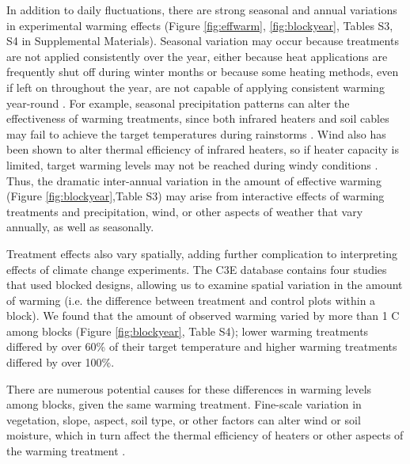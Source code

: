 \documentclass{article}
\begin{document}
\par In addition to daily fluctuations, there are strong seasonal and annual variations in experimental warming effects (Figure \ref{fig:effwarm}, \ref{fig:blockyear}, Tables S3, S4 in Supplemental Materials). Seasonal variation may occur because treatments are not applied consistently over the year, either because heat applications are frequently shut off during winter months or because some heating methods, even if left on throughout the year, are not capable of applying consistent warming year-round \citep[e.g.][]{clark2014a,clark2014b,hagedorn2010}. For example, seasonal precipitation patterns can alter the effectiveness of warming treatments, since both infrared heaters and soil cables may fail to achieve the target temperatures during rainstorms \citep{peterjohn1993,hoeppner2012}. Wind also has been shown to alter thermal efficiency of infrared heaters, so if heater capacity is limited, target warming levels may not be reached during windy conditions \citep{kimball2005,kimball2008}. Thus, the dramatic inter-annual variation in the amount of effective warming (Figure \ref{fig:blockyear},Table S3) may arise from interactive effects of warming treatments and precipitation, wind, or other aspects of weather that vary annually, as well as seasonally. 

\par Treatment effects also vary spatially, adding further complication to interpreting effects of climate change experiments. The C3E database contains four studies that used blocked designs, allowing us to examine spatial variation in the amount of warming (i.e. the difference between treatment and control plots within a block). We found that the amount of observed warming varied by more than 1 \degree C among blocks (Figure \ref{fig:blockyear}, Table S4); lower warming treatments differed by over 60\% of their target temperature and higher warming treatments differed by over 100\%. 

\par There are numerous potential causes for these differences in warming levels among blocks, given the same warming treatment. Fine-scale variation in vegetation, slope, aspect, soil type, or other factors can alter wind or soil moisture, which in turn affect the thermal efficiency of heaters or other aspects of the warming treatment \citep{peterjohn1993,kimball2005,kimball2008,hoeppner2012,rollinson2015}. %
\end{document}
